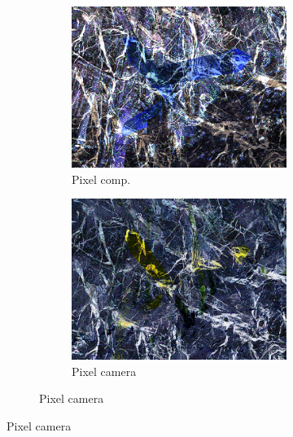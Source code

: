 \begin{figure}[]
\begin{subfigure}{\textwidth}
\begin{subfigure}{0.24\textwidth}
            \includegraphics[width=\textwidth]{images/04-experiment02/photo/marble/pixel_im.jpg}
            \caption*{Pixel comp.}
        \end{subfigure}
        \hfill
        \begin{subfigure}{0.24\textwidth}
            \centering
            \includegraphics[width=\textwidth]{images/04-experiment02/photo/marble/pixel_proj.jpg}
            \caption*{Pixel camera}
        \end{subfigure}
    \end{subfigure}


\end{figure}
